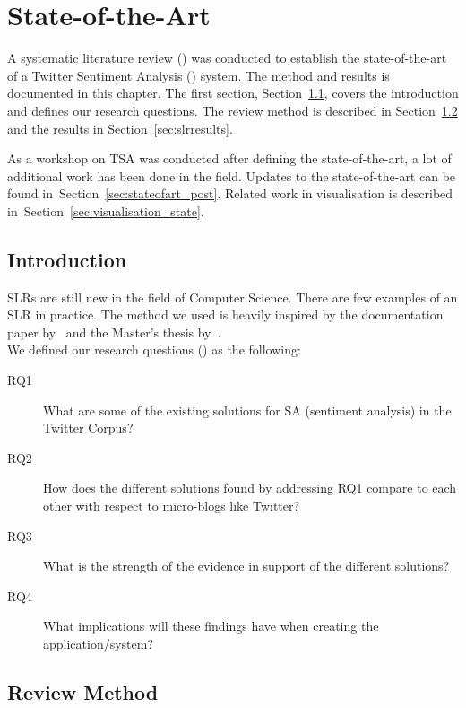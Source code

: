 \chapter{State-of-the-Art}

A systematic literature review () was conducted to establish the state-of-the-art of a Twitter Sentiment Analysis () system. The method and results is documented in this chapter. The first section, Section~\ref{sec:slrintro}, covers the introduction and defines our research questions. The review method is described in Section~\ref{sec:slrmethod} and the results in Section~\ref{sec:slrresults}.

As a workshop on TSA was conducted after defining the state-of-the-art, a lot of additional work has been done in the field. Updates to the state-of-the-art can be found in~Section~\ref{sec:stateofart_post}. Related work in visualisation is described in~Section~\ref{sec:visualisation_state}.

\section{Introduction}
\label{sec:slrintro}

SLRs are still new in the field of Computer Science. There are few examples of an SLR in practice. The method we used is heavily inspired by the documentation paper by~\cite{paper:slrdesc} and the Master's thesis by~\cite{master:slr}. \\

\noindent We defined our research questions () as the following:

\begin{description}

\item[RQ1] What are some of the existing solutions for SA (sentiment analysis) in the Twitter Corpus?
\item[RQ2] How does the different solutions found by addressing RQ1 compare to each other with respect to micro-blogs like Twitter?
\item[RQ3] What is the strength of the evidence in support of the different solutions?
\item[RQ4] What implications will these findings have when creating the application/system?

\end{description}

\section{Review Method}
\label{sec:slrmethod}

